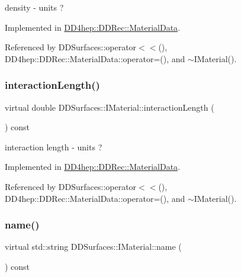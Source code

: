 density -\/ units ? 



Implemented in \hyperlink{class_d_d4hep_1_1_d_d_rec_1_1_material_data_ad914f7bb89899a8e23bc927574b54b61}{D\+D4hep\+::\+D\+D\+Rec\+::\+Material\+Data}.



Referenced by D\+D\+Surfaces\+::operator$<$$<$(), D\+D4hep\+::\+D\+D\+Rec\+::\+Material\+Data\+::operator=(), and $\sim$\+I\+Material().

\hypertarget{class_d_d_surfaces_1_1_i_material_a9217c1bc6b4c5562893c4249967cf64d}{}\label{class_d_d_surfaces_1_1_i_material_a9217c1bc6b4c5562893c4249967cf64d} 
\subsubsection{\texorpdfstring{interaction\+Length()}{interactionLength()}}
{\footnotesize\ttfamily virtual double D\+D\+Surfaces\+::\+I\+Material\+::interaction\+Length (\begin{DoxyParamCaption}{ }\end{DoxyParamCaption}) const\hspace{0.3cm}{\ttfamily [pure virtual]}}



interaction length -\/ units ? 



Implemented in \hyperlink{class_d_d4hep_1_1_d_d_rec_1_1_material_data_aa0b2daf7a34cc83b58192cd0aff4dbbe}{D\+D4hep\+::\+D\+D\+Rec\+::\+Material\+Data}.



Referenced by D\+D\+Surfaces\+::operator$<$$<$(), D\+D4hep\+::\+D\+D\+Rec\+::\+Material\+Data\+::operator=(), and $\sim$\+I\+Material().

\hypertarget{class_d_d_surfaces_1_1_i_material_a2ae91470bda1952ae8dbcef59d655540}{}\label{class_d_d_surfaces_1_1_i_material_a2ae91470bda1952ae8dbcef59d655540} 
\subsubsection{\texorpdfstring{name()}{name()}}
{\footnotesize\ttfamily virtual std\+::string D\+D\+Surfaces\+::\+I\+Material\+::name (\begin{DoxyParamCaption}{ }\end{DoxyParamCaption}) const\hspace{0.3cm}{\ttfamily [pure virtual]}}



